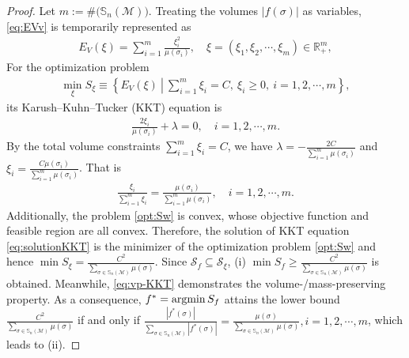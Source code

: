 \documentclass{article}
\begin{document}
\begin{proof}
    Let $m:=\#\big( \mathbb{S}_n(\mathcal{M}) \big)$. Treating the volumes $|f(\sigma)|$ as variables, \eqref{eq:EVv} is temporarily represented as
    \begin{align}
        E_V(\xi) = \sum_{i = 1}^m \frac{\xi_i^2}{\mu(\sigma_i)}, \quad \xi = (\xi_1,\xi_2,\cdots,\xi_m) \in \mathbb{R}^m_+,
    \end{align}
    For the optimization problem
    \begin{align} \label{opt:Sw}
        \min_\xi S_\xi \equiv \left\{
        E_V(\xi) ~\left|~ \sum_{i = 1}^m \xi_i = C,~ \xi_i\geq 0, ~i = 1,2,\cdots,m
        \right.\right\},
    \end{align}
    its Karush–Kuhn–Tucker (KKT) equation is
    \begin{align} \label{eq:solutionKKT}
        \frac{2\xi_i}{\mu(\sigma_i)} + \lambda = 0,\quad i = 1,2,\cdots,m.
    \end{align}
    By the total volume constraints $\sum_{i = 1}^m \xi_i = C$, we have $\lambda = -\frac{2C}{\sum_{i=1}^m \mu(\sigma_i)}$ and $\xi_i = \frac{C \mu(\sigma_i)}{\sum_{i=1}^m \mu(\sigma_i)}$. That is
    \begin{align} \label{eq:vp-KKT}
        \frac{\xi_i}{\sum_{i=1}^m \xi_i} = \frac{\mu(\sigma_i)}{\sum_{i=1}^m \mu(\sigma_i)},\quad i = 1,2,\cdots,m.
    \end{align}
    Additionally, the problem \eqref{opt:Sw} is convex, whose objective function and feasible region are all convex. Therefore, the solution of KKT equation \eqref{eq:solutionKKT} is the minimizer of the optimization problem \eqref{opt:Sw} and hence $\min S_\xi = \frac{C^2}{\sum_{\sigma \in \mathbb{S}_n(\mathcal{M})} \mu(\sigma)}$. Since $\mathcal{S}_{f} \subseteq \mathcal{S}_{\xi}$, (i) $\min S_f \geq \frac{C^2}{\sum_{\sigma \in \mathbb{S}_n(\mathcal{M})} \mu(\sigma)}$ is obtained. Meanwhile, \eqref{eq:vp-KKT} demonstrates the volume-/mass-preserving property. As a consequence, $f^* = \argmin S_f$ attains the lower bound $\frac{C^2}{\sum_{\sigma \in \mathbb{S}_n(\mathcal{M})} \mu(\sigma)}$ if and only if $\frac{|f^*(\sigma)|}{\sum_{\sigma\in \mathbb{S}_n(\mathcal{M})} |f^*(\sigma)|} = \frac{\mu(\sigma)}{\sum_{\sigma\in \mathbb{S}_n(\mathcal{M})} \mu(\sigma)},i = 1,2,\cdots,m$, which leads to (ii).
\end{proof}
\end{document}
